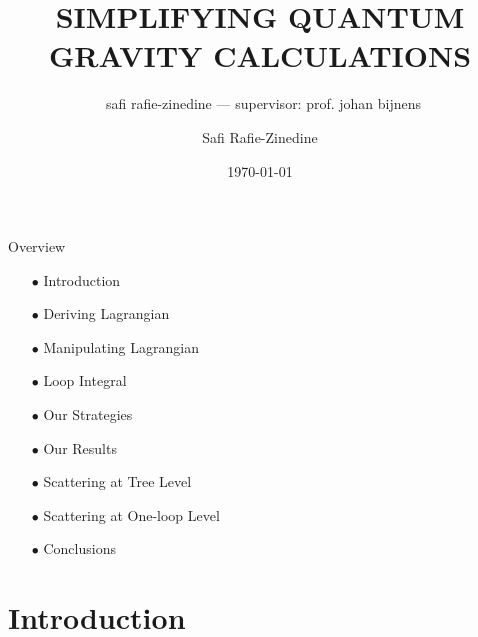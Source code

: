 \documentclass[aspectratio=169,usenames,dvipsnames]{beamer}
\title[Master Thesis Presentation]{\large{SIMPLIFYING QUANTUM GRAVITY CALCULATIONS}}
\author{Safi Rafie-Zinedine}
\subtitle{\qquad\, \lowercase{\uppercase{S}afi \uppercase{R}afie-\uppercase{Z}inedine \;\qquad --- \;\qquad \uppercase{S}upervisor: \uppercase{P}rof. \uppercase{J}ohan \uppercase{B}ijnens}}
\date{\today}
\institute{Lund University\\Department of Portals}
\begin{document}
\titleframe

\begin{frame}{Overview} \bf
  \begin{center}
    \begin{minipage}{0.42\textwidth}
      \begin{itemize}
        \item[$\bullet$]      Introduction    \vspace{5.0pt}  \\
        \item[$\bullet$]      Deriving Lagrangian  \\ \vspace{5.0pt} 
        \item[$\bullet$]      Manipulating Lagrangian  \\ \vspace{5.0pt}
        \item[$\bullet$]      Loop Integral  \\ \vspace{5.0pt}
        \item[$\bullet$]      Our Strategies \\ \vspace{5.0pt}
        \item[$\bullet$]      Our Results \\ \vspace{5.0pt}
        \item[$\bullet$]      Scattering at Tree Level \\ \vspace{5.0pt}
        \item[$\bullet$]      Scattering at One-loop Level \\ \vspace{5.0pt}
        \item[$\bullet$]      Conclusions \\ \vspace{40.0pt}
      \end{itemize}
    \end{minipage}
    \vfill
  \end{center}

\vspace*{100mm}
\end{frame}

\section{\bf Introduction}
\end{document}
